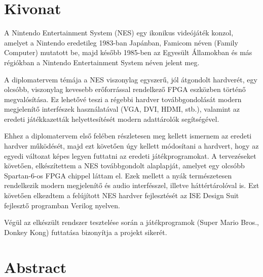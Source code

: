 \setcounter{page}{1}

\selecthungarian

\chapter*{Kivonat}

A Nintendo Entertainment System (NES) egy ikonikus videójáték konzol, amelyet a Nintendo eredetileg 1983-ban Japánban, Famicom néven (Family Computer) mutatott be, majd később 1985-ben az Egyesült Államokban és más régiókban a Nintendo Entertainment System néven jelent meg.

A diplomatervem témája a NES viszonylag egyszerű, jól átgondolt hardverét, egy olcsóbb, viszonylag kevesebb erőforrással rendelkező FPGA eszközben történő megvalósítása. Ez lehetővé teszi a régebbi hardver továbbgondolását modern megjelenítő interfészek használatával (VGA, DVI, HDMI, stb.), valamint az eredeti játékkazetták helyettesítését modern adattárolók segítségével.

Ehhez a diplomatervem első felében részletesen meg kellett ismernem az eredeti hardver működését, majd ezt követően úgy kellett módosítani a hardvert, hogy az egyedi változat képes legyen futtatni az eredeti játékprogramokat. A tervezéseket követően, elkészítettem a NES továbbgondolt alaplapját, amelyet egy olcsóbb Spartan-6-os FPGA chippel láttam el. Ezek mellett a nyák természetesen rendelkezik modern megjelenítő és audio interfésszel, illetve háttértárolóval is. Ezt követően elkezdtem a felújított NES hardver fejlesztését az ISE Design Suit fejlesztő programban Verilog nyelven. 

Végül az elkészült rendszer tesztelése során a játékprogramok (Super Mario Bros., Donkey Kong) futtatása bizonyítja a projekt sikerét.

\vfill
\selectenglish


\chapter*{Abstract}

